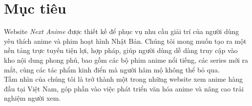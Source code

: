 \section{Mục tiêu}

\headindent Website \textit{Next Anime} được thiết kế để phục vụ nhu cầu giải trí của người dùng yêu thích anime và phim hoạt hình Nhật Bản. Chúng tôi mong muốn tạo ra một nền tảng trực tuyến tiện lợi, hợp pháp, giúp người dùng dễ dàng truy cập vào kho nội dung phong phú, bao gồm các bộ phim anime nổi tiếng, các series mới ra mắt, cùng các tác phẩm kinh điển mà người hâm mộ không thể bỏ qua. 
\\
\headindent Tầm nhìn của chúng tôi là trở thành một trong những website xem anime hàng đầu tại Việt Nam, góp phần vào việc phát triển văn hóa anime và nâng cao trải nghiệm người xem.
\pagebreak